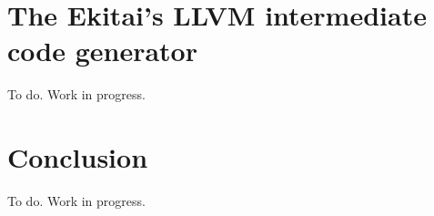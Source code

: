 \documentclass[
  oneside,
  english,
  coorientadorbanca,
  noabntexcite
]{ufsc-thesis-rn46-2019}
\begin{document}
\section{The Ekitai's LLVM intermediate code generator}

To do. Work in progress.

\section{Conclusion}

To do. Work in progress.


\postextual{}

\printbibliography{}
\end{document}
